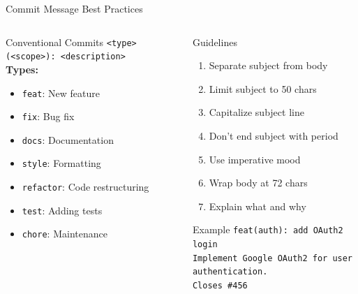 \documentclass[aspectratio=169]{beamer}
\begin{document}
	\begin{frame}{Commit Message Best Practices}
		\begin{columns}[T]
			\begin{block}{Conventional Commits}
				\texttt{\textless type\textgreater (\textless scope\textgreater): \textless description\textgreater}\\
				\vspace{0.2cm}
				\textbf{Types:}
				\begin{itemize}
					\item \texttt{feat}: New feature
					\item \texttt{fix}: Bug fix
					\item \texttt{docs}: Documentation
					\item \texttt{style}: Formatting
					\item \texttt{refactor}: Code restructuring
					\item \texttt{test}: Adding tests
					\item \texttt{chore}: Maintenance
				\end{itemize}
			\end{block}
			
			\begin{block}{Guidelines}
				\begin{enumerate}
					\item Separate subject from body
					\item Limit subject to 50 chars
					\item Capitalize subject line
					\item Don't end subject with period
					\item Use imperative mood
					\item Wrap body at 72 chars
					\item Explain what and why
				\end{enumerate}
				\vspace{0.3cm}
				\begin{exampleblock}{Example}
					\texttt{feat(auth): add OAuth2 login}\\
					\vspace{0.1cm}
					\texttt{Implement Google OAuth2 for user authentication.}\\
					\vspace{0.1cm}
					\texttt{Closes \#456}
				\end{exampleblock}
			\end{block}
		\end{columns}
	\end{frame}
	
\end{document}
